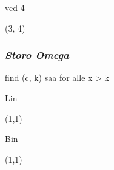 \documentclass{article}
\begin{document}
\begin{Maple Normal}{
}\end{Maple Normal}
\begin{Maple Normal}{
ved 4}\end{Maple Normal}

\begin{Maple Normal}{
(3, 4)}\end{Maple Normal}

\begin{Maple Normal}{
}\end{Maple Normal}
\subsubsection{\textit{Storo Omega}}
\begin{Maple Normal}{
find (c, k) saa 
 for alle x > k}\end{Maple Normal}

\begin{Maple Normal}{
}\end{Maple Normal}
\begin{Maple Normal}{
Lin}\end{Maple Normal}

\begin{Maple Normal}{
}\end{Maple Normal}
\begin{Maple Normal}{
(1,1)}\end{Maple Normal}

\begin{Maple Normal}{
}\end{Maple Normal}
\begin{Maple Normal}{
Bin}\end{Maple Normal}

\begin{Maple Normal}{
}\end{Maple Normal}
\begin{Maple Normal}{
(1,1)}\end{Maple Normal}
\end{document}
